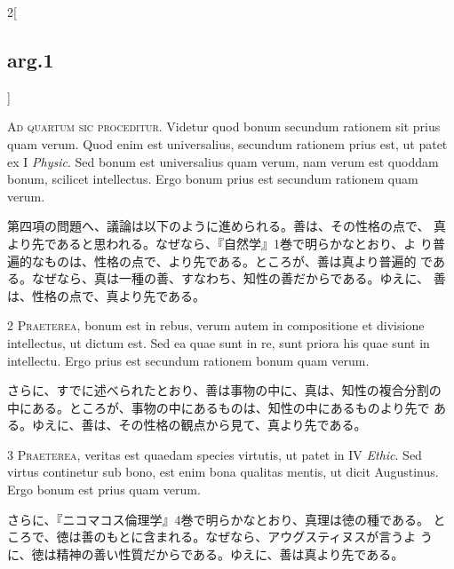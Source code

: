 \documentclass[paper=a4paper,fontsize=10pt,jafontsize=9pt,titlepage]{jlreq}
\begin{document}
\begin{paracol}{2}[\subsection{arg.1}]


{\huge A}{\scshape d quartum sic proceditur}. Videtur quod bonum
secundum rationem sit prius quam verum. Quod enim est universalius,
secundum rationem prius est, ut patet ex I {\itshape Physic}. Sed
bonum est universalius quam verum, nam verum est quoddam bonum,
scilicet intellectus. Ergo bonum prius est secundum rationem quam
verum.

\switchcolumn

第四項の問題へ、議論は以下のように進められる。善は、その性格の点で、
真より先であると思われる。なぜなら、『自然学』1巻で明らかなとおり、よ
り普遍的なものは、性格の点で、より先である。ところが、善は真より普遍的
である。なぜなら、真は一種の善、すなわち、知性の善だからである。ゆえに、
善は、性格の点で、真より先である。



{\scshape 2 Praeterea}, bonum est in rebus, verum autem in
compositione et divisione intellectus, ut dictum est. Sed ea quae sunt
in re, sunt priora his quae sunt in intellectu. Ergo prius est
secundum rationem bonum quam verum.

\switchcolumn

さらに、すでに述べられたとおり、善は事物の中に、真は、知性の複合分割の
 中にある。ところが、事物の中にあるものは、知性の中にあるものより先で
 ある。ゆえに、善は、その性格の観点から見て、真より先である。



{\scshape 3 Praeterea}, veritas est quaedam species virtutis, ut patet
in IV {\itshape Ethic}. Sed virtus continetur sub bono, est enim bona
qualitas mentis, ut dicit Augustinus. Ergo bonum est prius quam verum.

\switchcolumn

さらに、『ニコマコス倫理学』4巻で明らかなとおり、真理は徳の種である。
 ところで、徳は善のもとに含まれる。なぜなら、アウグスティヌスが言うよ
 うに、徳は精神の善い性質だからである。ゆえに、善は真より先である。


\end{paracol}
\end{document}
